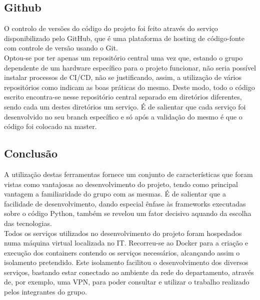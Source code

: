 \subsection{Github}
O controlo de versões do código do projeto foi feito através do serviço disponibilizado pelo GitHub, que é uma plataforma de hosting de código-fonte com controle de versão usando o Git.\cite{github}\newline\\
Optou-se por ter apenas um repositório central uma vez que, estando o grupo dependente de um hardware específico para o projeto funcionar, não seria possível instalar processos de CI/CD, não se justificando, assim, a utilização de vários repositórios como indicam as boas práticas do mesmo. Deste modo, todo o código escrito encontra-se nesse repositório central separado em diretórios diferentes, sendo cada um destes diretórios um serviço. É de salientar que cada serviço foi desenvolvido no seu branch específico e só após a validação do mesmo é que o código foi colocado na master.

\subsection{Conclusão}
A utilização destas ferramentas fornece um conjunto de características que foram vistas como vantajosas ao desenvolvimento do projeto, tendo como principal vantagem a familiaridade do grupo com as mesmas. É de salientar que a facilidade de desenvolvimento, dando especial ênfase às frameworks executadas sobre o código Python, também se revelou um fator decisivo aquando da escolha das tecnologias.\newline\\
Todos os serviços utilizados no desenvolvimento do projeto foram hospedados numa máquina virtual localizada no IT. Recorreu-se ao Docker para a criação e execução dos containers contendo os serviços necessários, alcançando assim o isolamento pretendido. Este isolamento facilitou o desenvolvimento dos diversos serviços,  bastando estar conectado ao ambiente da rede do departamento, através de, por exemplo, uma VPN, para poder consultar e utilizar o trabalho realizado pelos integrantes do grupo.
\newpage
\hfill\break
